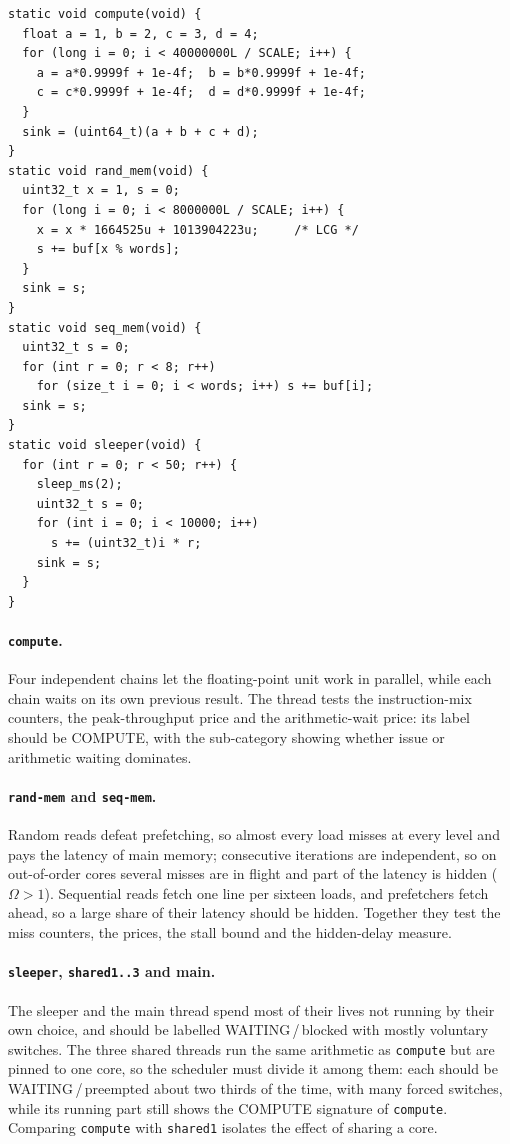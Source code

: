 \documentclass[10pt,a4paper,twocolumn]{article}
\newcommand{\code}[1]{\texttt{\small #1}}
\begin{document}
\begin{lstlisting}[caption={Thread bodies of the validation program (\code{workload.c}); \code{SCALE} reduces work on microcontrollers.},label={lst:work}]
static void compute(void) {
  float a = 1, b = 2, c = 3, d = 4;
  for (long i = 0; i < 40000000L / SCALE; i++) {
    a = a*0.9999f + 1e-4f;  b = b*0.9999f + 1e-4f;
    c = c*0.9999f + 1e-4f;  d = d*0.9999f + 1e-4f;
  }
  sink = (uint64_t)(a + b + c + d);
}
static void rand_mem(void) {
  uint32_t x = 1, s = 0;
  for (long i = 0; i < 8000000L / SCALE; i++) {
    x = x * 1664525u + 1013904223u;     /* LCG */
    s += buf[x % words];
  }
  sink = s;
}
static void seq_mem(void) {
  uint32_t s = 0;
  for (int r = 0; r < 8; r++)
    for (size_t i = 0; i < words; i++) s += buf[i];
  sink = s;
}
static void sleeper(void) {
  for (int r = 0; r < 50; r++) {
    sleep_ms(2);
    uint32_t s = 0;
    for (int i = 0; i < 10000; i++)
      s += (uint32_t)i * r;
    sink = s;
  }
}
\end{lstlisting}

\paragraph{\code{compute}.} Four independent chains let the floating-point unit work in parallel, while each chain waits on its own previous result. The thread tests the instruction-mix counters, the peak-throughput price and the arithmetic-wait price: its label should be COMPUTE, with the sub-category showing whether issue or arithmetic waiting dominates.

\paragraph{\code{rand-mem} and \code{seq-mem}.} Random reads defeat prefetching, so almost every load misses at every level and pays the latency of main memory; consecutive iterations are independent, so on out-of-order cores several misses are in flight and part of the latency is hidden ($\Omega>1$). Sequential reads fetch one line per sixteen loads, and prefetchers fetch ahead, so a large share of their latency should be hidden. Together they test the miss counters, the prices, the stall bound and the hidden-delay measure.

\paragraph{\code{sleeper}, \code{shared1..3} and main.} The sleeper and the main thread spend most of their lives not running by their own choice, and should be labelled WAITING\,/\,blocked with mostly voluntary switches. The three shared threads run the same arithmetic as \code{compute} but are pinned to one core, so the scheduler must divide it among them: each should be WAITING\,/\,preempted about two thirds of the time, with many forced switches, while its running part still shows the COMPUTE signature of \code{compute}. Comparing \code{compute} with \code{shared1} isolates the effect of sharing a core.
\end{document}
